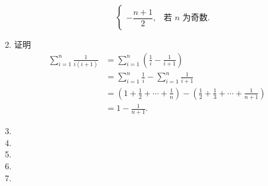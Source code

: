 \documentclass[a4paper, 11pt]{ctexart}
\begin{document}
\begin{enumerate}
\begin{enumerate}[(1)]
\[\begin{cases}
                            -\dfrac{n+1}{2}, & \text{若 $n$ 为奇数}.
                        \end{cases}    
                    \]
            \end{enumerate}
        \item %
            {\heiti 证明}\quad \begin{align*}
                \sum_{i=1}^n\frac{1}{i(i+1)} &= \sum_{i=1}^n\left(\frac1i - \frac{1}{i+1}\right) \\
                                             &= \sum_{i=1}^n\frac1i - \sum_{i=1}^n\frac{1}{i+1} \\
                                             &= \left(1 + \frac12 + \cdots + \frac1n\right) - \left(\frac12 + \frac13 + \cdots + \frac{1}{n+1}\right) \\
                                             &= 1 - \frac{1}{n+1}.
            \end{align*}
        \item %
        \item %
        \item %
        \item %
        \item %
    \end{enumerate}
\end{document}
